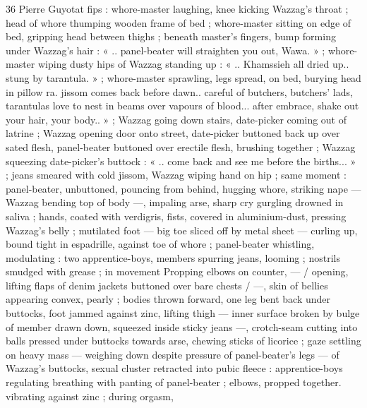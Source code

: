 36 Pierre Guyotat
fips : whore-master laughing, knee kicking Wazzag's throat ; head of
whore thumping wooden frame of bed ; whore-master sitting on edge
of bed, gripping head between thighs ; beneath master's fingers,
bump forming under Wazzag’s hair : « .. panel-beater will straighten
you out, Wawa. » ; whore-master wiping dusty hips of Wazzag
standing up : « .. Khamssieh all dried up.. stung by tarantula. » ;
whore-master sprawling, legs spread, on bed, burying head in pillow
ra. jissom comes back before dawn.. careful of butchers, butchers’
lads, tarantulas love to nest in beams over vapours of blood... after
embrace, shake out your hair, your body.. » ; Wazzag going down
stairs, date-picker coming out of latrine ; Wazzag opening door onto
street, date-picker buttoned back up over sated flesh, panel-beater
buttoned over erectile flesh, brushing together ; Wazzag squeezing
date-picker's buttock : « .. come back and see me before the births...
» ; jeans smeared with cold jissom, Wazzag wiping hand on hip ; same
moment : panel-beater, unbuttoned, pouncing from behind, hugging
whore, striking nape — Wazzag bending top of body —, impaling
arse, sharp cry gurgling drowned in saliva ; hands, coated with
verdigris, fists, covered in aluminium-dust, pressing Wazzag's belly ;
mutilated foot — big toe sliced off by metal sheet — curling up,
bound tight in espadrille, against toe of whore ; panel-beater
whistling, modulating : two apprentice-boys, members spurring
jeans, looming ; nostrils smudged with grease ; in movement
Propping elbows on counter, — / opening, lifting flaps of denim
jackets buttoned over bare chests / —, skin of bellies appearing
convex, pearly ; bodies thrown forward, one leg bent back under
buttocks, foot jammed against zinc, lifting thigh — inner surface
broken by bulge of member drawn down, squeezed inside sticky
jeans —, crotch-seam cutting into balls pressed under buttocks
towards arse, chewing sticks of licorice ; gaze settling on heavy mass
— weighing down despite pressure of panel-beater's legs — of
Wazzag's buttocks, sexual cluster retracted into pubic fleece :
apprentice-boys regulating breathing with panting of panel-beater ;
elbows, propped together. vibrating against zinc ; during orgasm,

